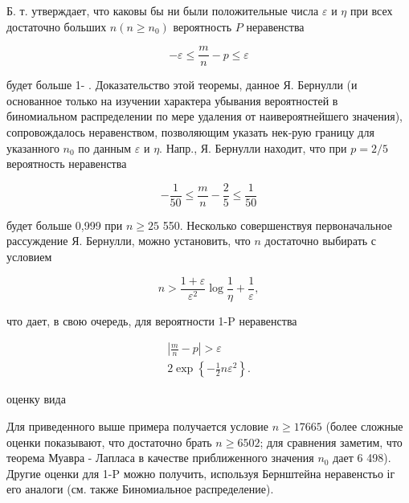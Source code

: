 \documentclass[10pt]{article}
\begin{document}
Б. т. утверждает, что каковы бы ни были положительные числа $\varepsilon$ и $\eta$ при всех достаточно больших $n\left(n \geqslant n_{0}\right)$ вероятность $P$ неравенства



\[

-\varepsilon \leqslant \frac{m}{n}-p \leqslant \varepsilon

\]



будет больше 1- . Доказательство этой теоремы, данное Я. Бернулли (и основанное только на изучении характера убывания вероятностей в биномиальном распределении по мере удаления от наивероятнейшего значения), сопровождалось неравенством, позволяющим указать нек-рую границу для указанного $n_{0}$ по данным $\varepsilon$ и $\eta$. Напр., Я. Бернулли находит, что при $p=2 / 5$ вероятность неравенства



\[

-\frac{1}{50} \leqslant \frac{m}{n}-\frac{2}{5} \leqslant \frac{1}{50}

\]



будет больше 0,999 при $n \geqslant 25$ 550. Несколько совершенствуя первоначальное рассуждение Я. Бернулли, можно установить, что $n$ достаточно выбирать с условием



\[

n>\frac{1+\varepsilon}{\varepsilon^{2}} \log \frac{1}{\eta}+\frac{1}{\varepsilon},

\]



что дает, в свою очередь, для вероятности 1-P неравенства



\[

\begin{gathered}

\left|\frac{m}{n}-p\right|>\varepsilon \\

2 \exp \left\{-\frac{1}{2} n \varepsilon^{2}\right\} .

\end{gathered}

\]



оценку вида



Для приведенного выше примера получается условие $n \geqslant 17665$ (более сложные оценки показывают, что достаточно брать $n \geqslant 6502$; для сравнения заметим, что теорема Муавра - Лапласа в качестве приближенного значения $n_{0}$ дает 6 498). Другие оценки для 1-P можно получить, используя Бернштейна неравенстьо іг его аналоги (см. также Биномиальное распределение).
\end{document}
